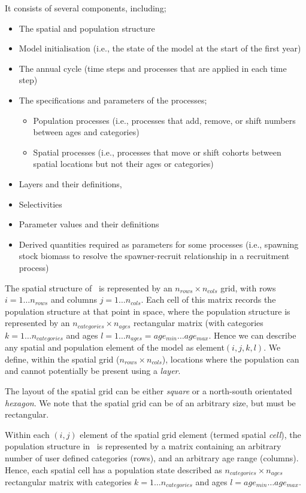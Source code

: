 It consists of several components, including;
\begin{itemize}
  \item The spatial and population structure
  \item Model initialisation (i.e., the state of the model at the start of the first year)
  \item The annual cycle (time steps and processes that are applied in each time step)
  \item The specifications and parameters of the processes;
  \begin{itemize}
    \item Population processes (i.e., processes that add, remove, or shift numbers between ages and categories)
    \item Spatial processes (i.e., processes that move or shift cohorts between spatial locations but not their ages or categories)
  \end{itemize}
  \item Layers and their definitions,
  \item Selectivities
  \item Parameter values and their definitions
  \item Derived quantities required as parameters for some processes (i.e., spawning stock biomass to resolve the spawner-recruit relationship in a recruitment process)
\end{itemize}

The spatial structure of \SPM\ is represented by an $n_{rows} \times n_{cols}$ grid, with rows $i=1 \dots n_{rows}$ and columns $j=1 \ldots n_{cols}$. Each cell of this matrix records the population structure at that point in space, where the population structure is represented by an $n_{categories} \times n_{ages}$ rectangular matrix (with categories $k=1 \ldots n_{categories}$ and ages $l=1 \ldots n_{ages} = age_{min} \ldots age_{max}$. Hence we can describe any spatial and population element of the model as element$(i,j,k,l)$. We define, within the spatial grid ($n_{rows} \times n_{cols}$), locations where the population can and cannot potentially be present using a \emph{layer}. 

The layout of the spatial grid can be either \emph{square} or a north-south orientated \emph{hexagon}. We note that the spatial grid can be of an arbitrary size, but must be rectangular. 

Within each $(i,j)$ element of the spatial grid element (termed spatial \emph{cell}), the population structure in \SPM\ is represented by a matrix containing an arbitrary number of user defined categories (rows), and an arbitrary age range (columns). Hence, each spatial cell has a population state described as $n_{categories} \times n_{ages}$ rectangular matrix with categories $k=1 \ldots n_{categories}$ and ages $l=age_{min} \ldots age_{max}$. 

